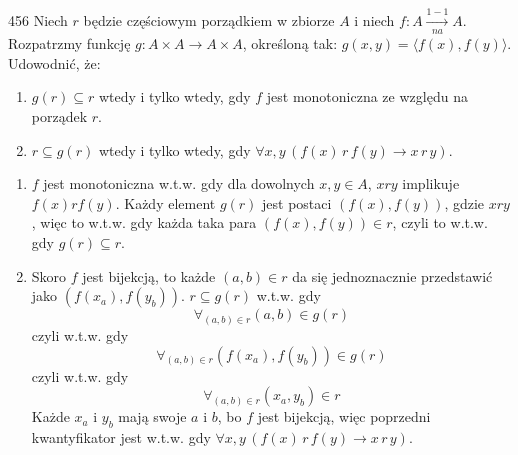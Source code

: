 \documentclass{../note}
\begin{document}
\begin{zadanie}{456}
Niech $r$ będzie częściowym porządkiem w zbiorze $A$ i niech $f: A \xrightarrow[na]{1-1} A$. Rozpatrzmy funkcję $g: A \times A \to A \times A$, określoną tak: $g(x,y) = \langle f(x), f(y) \rangle$. Udowodnić, że:
\begin{enumerate}[label=(\alph*)]
    \item $g(r) \subseteq r$ wtedy i tylko wtedy, gdy $f$ jest monotoniczna ze względu na porządek $r$.
    \item $r \subseteq g(r)$ wtedy i tylko wtedy, gdy $\forall x,y \, (f(x) \, r \, f(y) \to x \, r \, y)$.
\end{enumerate}
\end{zadanie}
\begin{rozwiazanie}
\begin{enumerate}[label=(\alph*)]
    \item $f$ jest monotoniczna w.t.w. gdy dla dowolnych $x, y \in A$, $x r y$ implikuje $f(x) r f(y)$. Każdy element $g(r)$ jest postaci $(f(x), f(y))$, gdzie $xry$, więc to w.t.w. gdy każda taka para $(f(x), f(y)) \in r$, czyli to w.t.w. gdy $g(r) \subseteq r$.
    \item Skoro $f$ jest bijekcją, to każde $(a, b) \in r$ da się jednoznacznie przedstawić jako $(f(x_a), f(y_b))$. $r \subseteq g(r)$ w.t.w. gdy $$\forall_{(a, b)\in r} (a, b) \in g(r)$$czyli w.t.w. gdy $$\forall_{(a, b)\in r} (f(x_a), f(y_b)) \in g(r)$$ czyli w.t.w. gdy $$\forall_{(a, b)\in r} (x_a, y_b) \in r$$Każde $x_a$ i $y_b$ mają swoje $a$ i $b$, bo $f$ jest bijekcją, więc poprzedni kwantyfikator jest w.t.w. gdy $\forall x,y \, (f(x) \, r \, f(y) \to x \, r \, y)$.
\end{enumerate}
\end{rozwiazanie}
\end{document}
